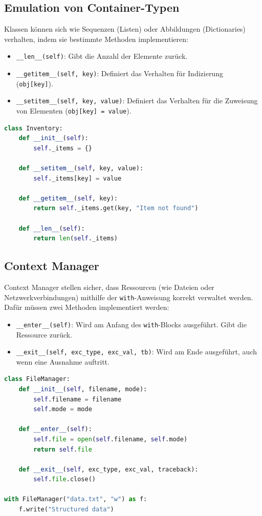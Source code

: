 \subsection{Emulation von Container-Typen}
Klassen können sich wie Sequenzen (Listen) oder Abbildungen (Dictionaries) verhalten, indem sie bestimmte Methoden implementieren:
\begin{itemize}
    \item \texttt{\_\_len\_\_(self)}: Gibt die Anzahl der Elemente zurück.
    \item \texttt{\_\_getitem\_\_(self, key)}: Definiert das Verhalten für Indizierung (\texttt{obj[key]}).
    \item \texttt{\_\_setitem\_\_(self, key, value)}: Definiert das Verhalten für die Zuweisung von Elementen (\texttt{obj[key] = value}).
\end{itemize}

\begin{lstlisting}[language=Python]
class Inventory:
    def __init__(self):
        self._items = {}

    def __setitem__(self, key, value):
        self._items[key] = value

    def __getitem__(self, key):
        return self._items.get(key, "Item not found")

    def __len__(self):
        return len(self._items)
\end{lstlisting}

\subsection{Context Manager}
Context Manager stellen sicher, dass Ressourcen (wie Dateien oder Netzwerkverbindungen) mithilfe der \texttt{with}-Anweisung korrekt verwaltet werden. Dafür müssen zwei Methoden implementiert werden:
\begin{itemize}
    \item \texttt{\_\_enter\_\_(self)}: Wird am Anfang des \texttt{with}-Blocks ausgeführt. Gibt die Ressource zurück.
    \item \texttt{\_\_exit\_\_(self, exc\_type, exc\_val, tb)}: Wird am Ende ausgeführt, auch wenn eine Ausnahme auftritt.
\end{itemize}

\begin{lstlisting}[language=Python]
class FileManager:
    def __init__(self, filename, mode):
        self.filename = filename
        self.mode = mode

    def __enter__(self):
        self.file = open(self.filename, self.mode)
        return self.file

    def __exit__(self, exc_type, exc_val, traceback):
        self.file.close()

with FileManager("data.txt", "w") as f:
    f.write("Structured data")
\end{lstlisting}

